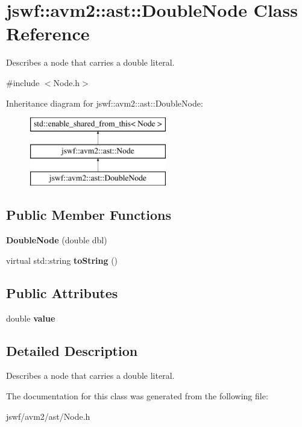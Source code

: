 \hypertarget{classjswf_1_1avm2_1_1ast_1_1_double_node}{\section{jswf\+:\+:avm2\+:\+:ast\+:\+:Double\+Node Class Reference}
\label{classjswf_1_1avm2_1_1ast_1_1_double_node}
}


Describes a node that carries a double literal.  




{\ttfamily \#include $<$Node.\+h$>$}

Inheritance diagram for jswf\+:\+:avm2\+:\+:ast\+:\+:Double\+Node\+:\begin{figure}[H]
\begin{center}
\leavevmode
\includegraphics[height=3.000000cm]{classjswf_1_1avm2_1_1ast_1_1_double_node}
\end{center}
\end{figure}
\subsection*{Public Member Functions}
\begin{DoxyCompactItemize}
\item 
\hypertarget{classjswf_1_1avm2_1_1ast_1_1_double_node_a2c8d42f7d6e53b861d1d06ba37346fd4}{{\bfseries Double\+Node} (double dbl)}\label{classjswf_1_1avm2_1_1ast_1_1_double_node_a2c8d42f7d6e53b861d1d06ba37346fd4}

\item 
\hypertarget{classjswf_1_1avm2_1_1ast_1_1_double_node_afd147c85f01bc0ee9c273b996669bb88}{virtual std\+::string {\bfseries to\+String} ()}\label{classjswf_1_1avm2_1_1ast_1_1_double_node_afd147c85f01bc0ee9c273b996669bb88}

\end{DoxyCompactItemize}
\subsection*{Public Attributes}
\begin{DoxyCompactItemize}
\item 
\hypertarget{classjswf_1_1avm2_1_1ast_1_1_double_node_a7800c126b9a9d8e7e4f7f3a4653a7682}{double {\bfseries value}}\label{classjswf_1_1avm2_1_1ast_1_1_double_node_a7800c126b9a9d8e7e4f7f3a4653a7682}

\end{DoxyCompactItemize}


\subsection{Detailed Description}
Describes a node that carries a double literal. 

The documentation for this class was generated from the following file\+:\begin{DoxyCompactItemize}
\item 
jswf/avm2/ast/Node.\+h\end{DoxyCompactItemize}
